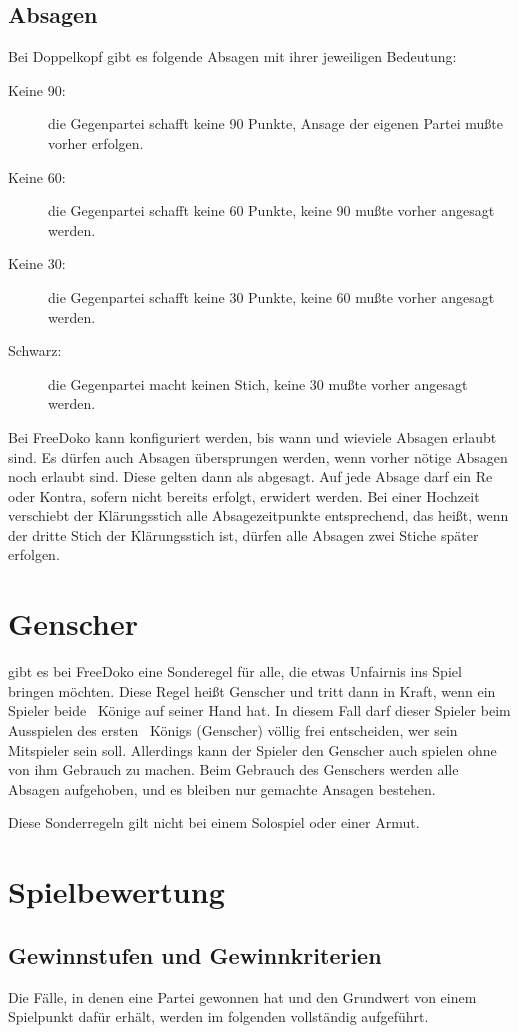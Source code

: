 \documentclass{scrartcl}
\begin{document}
\subsection{Absagen}
Bei Doppelkopf gibt es folgende Absagen mit ihrer jeweiligen Bedeutung:
\begin{description}
  \item[Keine 90:] die Gegenpartei schafft keine 90 Punkte, Ansage der eigenen Partei mußte vorher
    erfolgen.
  \item[Keine 60:] die Gegenpartei schafft keine 60 Punkte, keine 90 mußte vorher angesagt
    werden.
  \item[Keine 30:] die Gegenpartei schafft keine 30 Punkte, keine 60 mußte vorher angesagt
    werden.
  \item[Schwarz:] die Gegenpartei macht keinen Stich, keine 30 mußte vorher angesagt
    werden.
\end{description}
Bei FreeDoko kann \optional konfiguriert werden, bis wann und wieviele Absagen erlaubt sind. Es dürfen auch Absagen übersprungen werden, wenn vorher nötige Absagen noch erlaubt sind. Diese gelten dann als abgesagt. Auf jede Absage darf \optional ein Re oder Kontra, sofern nicht bereits erfolgt, erwidert werden. Bei einer Hochzeit verschiebt der Klärungsstich alle Absagezeitpunkte entsprechend, das heißt, wenn der dritte Stich der Klärungsstich ist, dürfen alle Absagen zwei Stiche später erfolgen.

\section{Genscher}
\Optional gibt es bei FreeDoko eine Sonderegel für alle, die etwas Unfairnis ins Spiel bringen möchten. Diese Regel heißt Genscher und tritt dann in Kraft, wenn ein Spieler beide \Karo\ Könige auf seiner Hand hat. In diesem Fall darf dieser Spieler beim Ausspielen des ersten \Karo\ Königs (Genscher) völlig frei entscheiden, wer sein Mitspieler sein soll. Allerdings kann der Spieler den Genscher auch spielen ohne von ihm Gebrauch zu machen.  Beim Gebrauch des Genschers werden alle Absagen aufgehoben, und es bleiben nur gemachte Ansagen bestehen.

Diese Sonderregeln gilt nicht bei einem Solospiel oder einer Armut.

\section{Spielbewertung}

\subsection{Gewinnstufen und Gewinnkriterien}
Die Fälle, in denen eine Partei gewonnen hat und den Grundwert von einem Spielpunkt dafür erhält, werden im folgenden vollständig aufgeführt.
\end{document}
